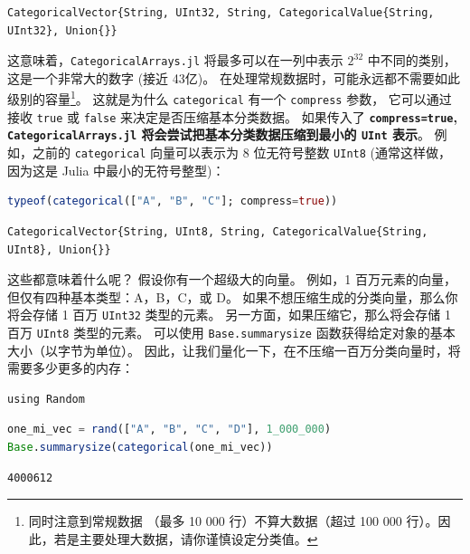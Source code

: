 \documentclass[
  notoc %
]{tufte-book}
\newcommand{\passthrough}[1]{#1}
\begin{document}
\begin{lstlisting}
CategoricalVector{String, UInt32, String, CategoricalValue{String, UInt32}, Union{}}
\end{lstlisting}

这意味着，\passthrough{\lstinline!CategoricalArrays.jl!}
将最多可以在一列中表示 \(2^{32}\) 中不同的类别，这是一个非常大的数字
(接近 43亿)。
在处理常规数据时，可能永远都不需要如此级别的容量\footnote{同时注意到常规数据
  （最多 10 000 行）不算大数据（超过 100 000
  行）。因此，若是主要处理大数据，请你谨慎设定分类值。}。 这就是为什么
\passthrough{\lstinline!categorical!} 有一个
\passthrough{\lstinline!compress!} 参数， 它可以通过接收
\passthrough{\lstinline!true!} 或 \passthrough{\lstinline!false!}
来决定是否压缩基本分类数据。 如果传入了
\textbf{\passthrough{\lstinline!compress=true!},
\passthrough{\lstinline!CategoricalArrays.jl!}
将会尝试把基本分类数据压缩到最小的 \passthrough{\lstinline!UInt!}
表示}。 例如，之前的 \passthrough{\lstinline!categorical!}
向量可以表示为 8 位无符号整数 \passthrough{\lstinline!UInt8!}
(通常这样做，因为这是 Julia 中最小的无符号整型)：

\begin{lstlisting}[language=Julia]
typeof(categorical(["A", "B", "C"]; compress=true))
\end{lstlisting}

\begin{lstlisting}
CategoricalVector{String, UInt8, String, CategoricalValue{String, UInt8}, Union{}}
\end{lstlisting}

这些都意味着什么呢？ 假设你有一个超级大的向量。 例如，1
百万元素的向量，但仅有四种基本类型：A，B，C，或 D。
如果不想压缩生成的分类向量，那么你将会存储 1 百万
\passthrough{\lstinline!UInt32!} 类型的元素。
另一方面，如果压缩它，那么将会存储 1 百万
\passthrough{\lstinline!UInt8!} 类型的元素。 可以使用
\passthrough{\lstinline!Base.summarysize!}
函数获得给定对象的基本大小（以字节为单位）。
因此，让我们量化一下，在不压缩一百万分类向量时，将需要多少更多的内存：

\begin{lstlisting}
using Random
\end{lstlisting}

\begin{lstlisting}[language=Julia]
one_mi_vec = rand(["A", "B", "C", "D"], 1_000_000)
Base.summarysize(categorical(one_mi_vec))
\end{lstlisting}

\begin{lstlisting}
4000612
\end{lstlisting}
\end{document}

